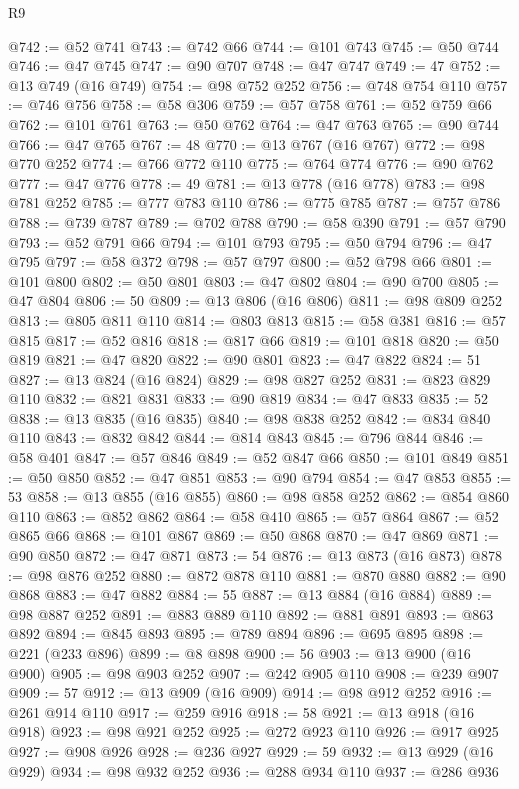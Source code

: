 \begin{lexlean}{R9}
\begin{coremodule}
@742 := @52 @741
@743 := @742 @66
@744 := @101 @743
@745 := @50 @744
@746 := @47 @745
@747 := @90 @707
@748 := @47 @747
@749 := 47
@752 := @13 @749 (@16 @749)
@754 := @98 @752 @252
@756 := @748 @754 @110
@757 := @746 @756
@758 := @58 @306
@759 := @57 @758
@761 := @52 @759 @66
@762 := @101 @761
@763 := @50 @762
@764 := @47 @763
@765 := @90 @744
@766 := @47 @765
@767 := 48
@770 := @13 @767 (@16 @767)
@772 := @98 @770 @252
@774 := @766 @772 @110
@775 := @764 @774
@776 := @90 @762
@777 := @47 @776
@778 := 49
@781 := @13 @778 (@16 @778)
@783 := @98 @781 @252
@785 := @777 @783 @110
@786 := @775 @785
@787 := @757 @786
@788 := @739 @787
@789 := @702 @788
@790 := @58 @390
@791 := @57 @790
@793 := @52 @791 @66
@794 := @101 @793
@795 := @50 @794
@796 := @47 @795
@797 := @58 @372
@798 := @57 @797
@800 := @52 @798 @66
@801 := @101 @800
@802 := @50 @801
@803 := @47 @802
@804 := @90 @700
@805 := @47 @804
@806 := 50
@809 := @13 @806 (@16 @806)
@811 := @98 @809 @252
@813 := @805 @811 @110
@814 := @803 @813
@815 := @58 @381
@816 := @57 @815
@817 := @52 @816
@818 := @817 @66
@819 := @101 @818
@820 := @50 @819
@821 := @47 @820
@822 := @90 @801
@823 := @47 @822
@824 := 51
@827 := @13 @824 (@16 @824)
@829 := @98 @827 @252
@831 := @823 @829 @110
@832 := @821 @831
@833 := @90 @819
@834 := @47 @833
@835 := 52
@838 := @13 @835 (@16 @835)
@840 := @98 @838 @252
@842 := @834 @840 @110
@843 := @832 @842
@844 := @814 @843
@845 := @796 @844
@846 := @58 @401
@847 := @57 @846
@849 := @52 @847 @66
@850 := @101 @849
@851 := @50 @850
@852 := @47 @851
@853 := @90 @794
@854 := @47 @853
@855 := 53
@858 := @13 @855 (@16 @855)
@860 := @98 @858 @252
@862 := @854 @860 @110
@863 := @852 @862
@864 := @58 @410
@865 := @57 @864
@867 := @52 @865 @66
@868 := @101 @867
@869 := @50 @868
@870 := @47 @869
@871 := @90 @850
@872 := @47 @871
@873 := 54
@876 := @13 @873 (@16 @873)
@878 := @98 @876 @252
@880 := @872 @878 @110
@881 := @870 @880
@882 := @90 @868
@883 := @47 @882
@884 := 55
@887 := @13 @884 (@16 @884)
@889 := @98 @887 @252
@891 := @883 @889 @110
@892 := @881 @891
@893 := @863 @892
@894 := @845 @893
@895 := @789 @894
@896 := @695 @895
@898 := @221 (@233 @896)
@899 := @8 @898
@900 := 56
@903 := @13 @900 (@16 @900)
@905 := @98 @903 @252
@907 := @242 @905 @110
@908 := @239 @907
@909 := 57
@912 := @13 @909 (@16 @909)
@914 := @98 @912 @252
@916 := @261 @914 @110
@917 := @259 @916
@918 := 58
@921 := @13 @918 (@16 @918)
@923 := @98 @921 @252
@925 := @272 @923 @110
@926 := @917 @925
@927 := @908 @926
@928 := @236 @927
@929 := 59
@932 := @13 @929 (@16 @929)
@934 := @98 @932 @252
@936 := @288 @934 @110
@937 := @286 @936

\end{coremodule}
\end{lexlean}
